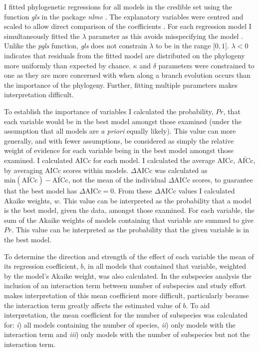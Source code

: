 I fitted phylogenetic regressions for all models in the credible set using the function \emph{gls} in the package \emph{nlme} \cite{nlme}.
The explanatory variables were centred and scaled to allow direct comparison of the coefficients \cite{schielzeth2010simple}.
For each regression model I simultaneously fitted the $\lambda$ parameter as this avoids misspecifying the model \cite{revell2010phylogenetic}.
Unlike the \emph{pgls} function, \emph{gls} does not constrain $\lambda$ to be in the range $\lbrack 0, 1\rbrack$.
$\lambda < 0$ indicates that residuals from the fitted model are distributed on the phylogeny more uniformly than expected by chance.
$\kappa$ and $\delta$ parameters were constrained to one as they are more concerned with when along a branch evolution occurs than the importance of the phylogeny.
Further, fitting multiple parameters makes interpretation difficult. 


To establish the importance of variables I calculated the probability, $Pr$, that each variable would be in the best model amongst those examined (under the assumption that all models are \emph{a priori} equally likely).
This value can more generally, and with fewer assumptions, be considered as simply the relative weight of evidence for each variable being in the best model amongst those examined.
I calculated AICc for each model.
I calculated the average AICc, $\bar{\text{AICc}}$, by averaging AICc scores within models.
$\Delta\text{AICc}$ was calculated as $\text{min}(\bar{\text{AICc}}) - \bar{\text{AICc}}$, not the mean of the individual $\Delta\text{AICc}$ scores, to guarantee that the best model has $\Delta\text{AICc} = 0$.
From these $\Delta\text{AICc}$ values I calculated Akaike weights, $w$.
This value can be interpreted as the probability that a model is the best model, given the data, amongst those examined.
For each variable, the sum of the Akaike weights of models containing that variable are summed to give $Pr$.
This value can be interpreted as the probability that the given variable is in the best model.

To determine the direction and strength of the effect of each variable the mean of its regression coefficient, $b$, in all models that contained that variable, weighted by the model's Akaike weight, was also calculated.
In the subspecies analysis the inclusion of an interaction term between number of subspecies and study effort makes interpretation of this mean coefficient more difficult, particularly because the interaction term greatly affects the estimated value of $b$.
To aid interpretation, the mean coefficient for the number of subspecies was calculated for: \emph{i}) all models containing the number of species, \emph{ii}) only models with the interaction term and \emph{iii}) only models with the number of subspecies but not the interaction term.






